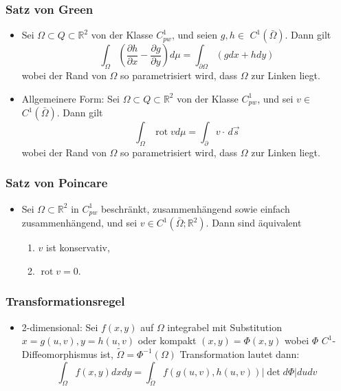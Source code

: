\documentclass[a3paper, 11pt, landscape]{scrartcl}
\DeclareMathOperator{\rot}{rot}
\begin{document}
\begin{multicols*}{3}
	\subsubsection{Satz von Green}
	\begin{itemize}
	    \item Sei $\Omega \subset Q \subset \mathbb{R}^{2}$ von der Klasse $C_{p w}^{1}$, und seien $g, h \in$ $C^{1}(\bar{\Omega}) .$ Dann gilt
$$
\int_{\Omega}\left(\frac{\partial h}{\partial x}-\frac{\partial g}{\partial y}\right) d \mu=\int_{\partial \Omega}(g d x+h d y)
$$
wobei der Rand von $\Omega$ so parametrisiert wird, dass $\Omega$ zur Linken liegt.
    \item Allgemeinere Form: Sei $\Omega \subset Q \subset \mathbb{R}^{2}$ von der Klasse $C_{p w}^{1}$, und sei $v \in$ $C^{1}(\bar{\Omega}) .$ Dann gilt
$$
\int_{\Omega} \rot v d \mu=\int_{\partial }v\cdot\,d\vec{s}
$$
wobei der Rand von $\Omega$ so parametrisiert wird, dass $\Omega$ zur Linken liegt.
	\end{itemize}
    \subsubsection{Satz von Poincare}
    \begin{itemize}
        \item Sei $\Omega \subset \mathbb{R}^{2}$ in $C_{p w}^{1}$ beschränkt, zusammenhängend sowie einfach zusammenhängend, und sei $v \in C^{1}\left(\bar{\Omega} ; \mathbb{R}^{2}\right) .$ Dann sind äquivalent
        \begin{enumerate}
            \item $v$ ist konservativ,
            \item $\operatorname{rot} v=0$.
        \end{enumerate}
    \end{itemize}
    
    \subsubsection{Transformationsregel}
    \begin{itemize}
        \item 2-dimensional: Sei $f(x,y)$ auf $\Omega$ integrabel mit Substitution $x=g(u,v),y=h(u,v)$ oder kompakt $(x,y)=\Phi(x,y)$ wobei $\Phi$ $C^1$-Diffeomorphismus ist, $\tilde{\Omega}=\Phi^{-1}(\Omega)$ Transformation lautet dann:\\
        $$\int_{\Omega} f(x, y) d x d y=\int_{\tilde{\Omega}} f(g(u, v), h(u, v))|\operatorname{det} d \Phi| d u d v$$
    

\end{itemize}
\end{multicols*}
\end{document}
